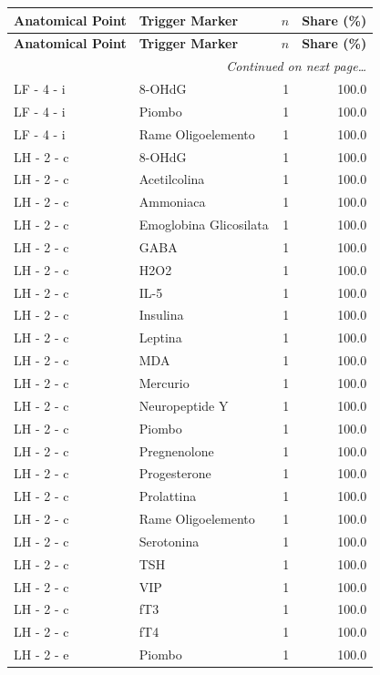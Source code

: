 \documentclass[a4paper,11pt]{article}
\begin{document}
\begin{footnotesize}
\begin{longtable}{p{3.5cm}p{7.5cm}rr}
\toprule
\textbf{Anatomical Point} &
\textbf{Trigger Marker} &
\textbf{$n$} &
\textbf{Share (\%)} \\
\midrule
\endfirsthead
\toprule
\textbf{Anatomical Point} &
\textbf{Trigger Marker} &
\textbf{$n$} &
\textbf{Share (\%)} \\
\midrule
\endhead
\midrule
\multicolumn{4}{r}{\footnotesize\emph{Continued on next page\ldots}} \\
\endfoot
\bottomrule
\endlastfoot
LF - 4 - i & 8-OHdG & 1 & 100.0 \\
LF - 4 - i & Piombo & 1 & 100.0 \\
LF - 4 - i & Rame Oligoelemento & 1 & 100.0 \\
LH - 2 - c & 8-OHdG & 1 & 100.0 \\
LH - 2 - c & Acetilcolina & 1 & 100.0 \\
LH - 2 - c & Ammoniaca & 1 & 100.0 \\
LH - 2 - c & Emoglobina Glicosilata & 1 & 100.0 \\
LH - 2 - c & GABA & 1 & 100.0 \\
LH - 2 - c & H2O2 & 1 & 100.0 \\
LH - 2 - c & IL-5 & 1 & 100.0 \\
LH - 2 - c & Insulina & 1 & 100.0 \\
LH - 2 - c & Leptina & 1 & 100.0 \\
LH - 2 - c & MDA & 1 & 100.0 \\
LH - 2 - c & Mercurio & 1 & 100.0 \\
LH - 2 - c & Neuropeptide Y & 1 & 100.0 \\
LH - 2 - c & Piombo & 1 & 100.0 \\
LH - 2 - c & Pregnenolone & 1 & 100.0 \\
LH - 2 - c & Progesterone & 1 & 100.0 \\
LH - 2 - c & Prolattina & 1 & 100.0 \\
LH - 2 - c & Rame Oligoelemento & 1 & 100.0 \\
LH - 2 - c & Serotonina & 1 & 100.0 \\
LH - 2 - c & TSH & 1 & 100.0 \\
LH - 2 - c & VIP & 1 & 100.0 \\
LH - 2 - c & fT3 & 1 & 100.0 \\
LH - 2 - c & fT4 & 1 & 100.0 \\
LH - 2 - e & Piombo & 1 & 100.0 \\

\end{longtable}
\end{footnotesize}
\end{document}

